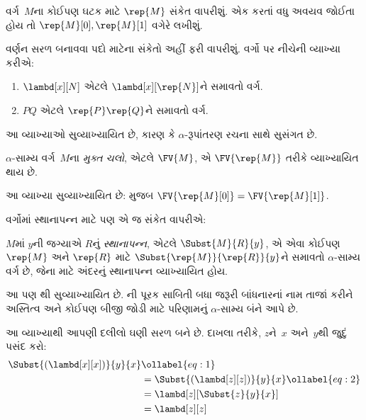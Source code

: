 વર્ગ~$M$ના કોઈપણ ઘટક માટે $\rep{M}$ સંકેત વાપરીશું.
એક કરતાં વધુ અવયવ જોઈતા હોય તો $\rep{M}[0], \rep{M}[1]$
વગેરે લખીશું.

વર્ણન સરળ બનાવવા પદો માટેના સંકેતો અહીં ફરી વાપરીશું.
વર્ગો પર નીચેની વ્યાખ્યા કરીએ:
\begin{defn}
  \begin{enumerate}
  \item $\lambd[x][N]$ એટલે $\lambd[x][\rep{N}]$ને
    સમાવતો વર્ગ.
  \item $PQ$ એટલે $\rep{P}\rep{Q}$ને સમાવતો વર્ગ.
  \end{enumerate}
\end{defn}

આ વ્યાખ્યાઓ સુવ્યાખ્યાયિત છે, કારણ કે $\alpha$-રૂપાંતરણ
રચના સાથે સુસંગત છે.

\begin{defn} 
  $\alpha$-સામ્ય વર્ગ~$M$ના \emph{મુક્ત ચલો}, એટલે
  $\FV{M}$, એ $\FV{\rep{M}}$ તરીકે વ્યાખ્યાયિત થાય છે.
\end{defn}

આ વ્યાખ્યા સુવ્યાખ્યાયિત છે:  મુજબ
$\FV{\rep{M}[0]} = \FV{\rep{M}[1]}$.

વર્ગોમાં સ્થાનાપન્ન માટે પણ એ જ સંકેત વાપરીએ:
\begin{defn} 
  $M$માં $y$ની જગ્યાએ $R$નું \emph{સ્થાનાપન્ન}, એટલે
  $\Subst{M}{R}{y}$, એ એવા કોઈપણ $\rep{M}$ અને
  $\rep{R}$ માટે $\Subst{\rep{M}}{\rep{R}}{y}$ને
  સમાવતો $\alpha$-સામ્ય વર્ગ છે, જેના માટે અંદરનું
  સ્થાનાપન્ન વ્યાખ્યાયિત હોય.
\end{defn}

આ પણ થી સુવ્યાખ્યાયિત છે.
ની પૂરક સાબિતી બધા જરૂરી બાંધનારનાં
નામ તાજાં કરીને અસ્તિત્વ અને કોઈપણ બીજી જોડી માટે
પરિણામનું $\alpha$-સામ્ય બંને આપે છે.

આ વ્યાખ્યાથી આપણી દલીલો ઘણી સરળ બને છે. દાખલા તરીકે,
$z$ને~$x$ અને~$y$થી જુદું પસંદ કરો:
\begin{align}
  \Subst{(\lambd[x][x])}{y}{x} & \ollabel{eq:1}\\
  &= \Subst{(\lambd[z][z])}{y}{x} \ollabel{eq:2}\\
  &= \lambd[z][\Subst{z}{y}{x}] \\
  &= \lambd[z][z]
\end{align}


